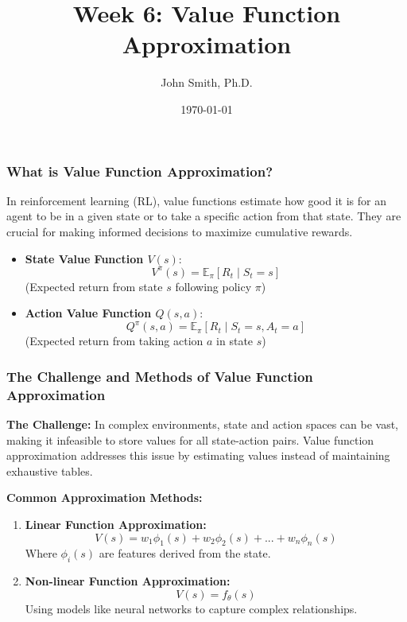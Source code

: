 \documentclass[aspectratio=169]{beamer}
\title[Week 6: Value Function Approximation]{Week 6: Value Function Approximation}
\author[J. Smith]{John Smith, Ph.D.}
\institute[University Name]{
  Department of Computer Science\\
  University Name\\
  \vspace{0.3cm}
  Email: email@university.edu\\
  Website: www.university.edu
}
\date{\today}
\begin{document}
\frame{\titlepage}

\begin{frame}[fragile]
    \titlepage
\end{frame}

\begin{frame}[fragile]
    \frametitle{What is Value Function Approximation?}
    
    In reinforcement learning (RL), value functions estimate how good it is for an agent to be in a given state or to take a specific action from that state. They are crucial for making informed decisions to maximize cumulative rewards.

    \begin{itemize}
        \item \textbf{State Value Function \( V(s) \)}: 
            \begin{equation*}
                V^\pi(s) = \mathbb{E}_\pi \left[ R_t \mid S_t = s \right]
            \end{equation*}
            (Expected return from state \( s \) following policy \( \pi \))
        
        \item \textbf{Action Value Function \( Q(s, a) \)}: 
            \begin{equation*}
                Q^\pi(s, a) = \mathbb{E}_\pi \left[ R_t \mid S_t = s, A_t = a \right]
            \end{equation*}
            (Expected return from taking action \( a \) in state \( s \))
    \end{itemize}
\end{frame}

\begin{frame}[fragile]
    \frametitle{The Challenge and Methods of Value Function Approximation}

    \textbf{The Challenge:}  
    In complex environments, state and action spaces can be vast, making it infeasible to store values for all state-action pairs. Value function approximation addresses this issue by estimating values instead of maintaining exhaustive tables.

    \textbf{Common Approximation Methods:}
    \begin{enumerate}
        \item \textbf{Linear Function Approximation:} 
            \begin{equation*}
                V(s) = w_1 \phi_1(s) + w_2 \phi_2(s) + ... + w_n \phi_n(s)
            \end{equation*}
            Where \( \phi_i(s) \) are features derived from the state.
        
        \item \textbf{Non-linear Function Approximation:} 
            \begin{equation*}
                V(s) = f_{\theta}(s)
            \end{equation*}
            Using models like neural networks to capture complex relationships.
    \end{enumerate}
\end{frame}
\end{document}
